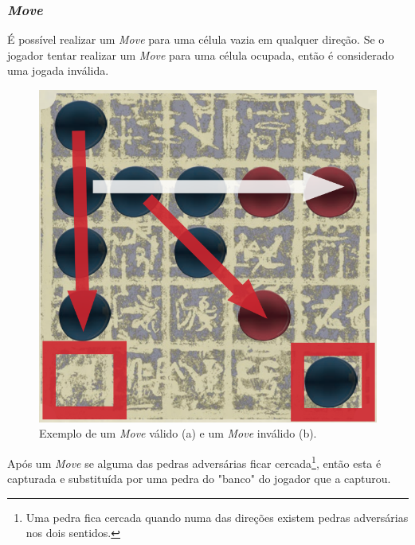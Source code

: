 \documentclass[a4paper]{article}
\begin{document}
\subsubsection{\textit{Move}}

É possível realizar um  \textit{Move} para uma célula vazia em qualquer direção. Se o jogador tentar realizar um \textit{Move} para uma célula ocupada, então é considerado uma jogada inválida.

\begin{figure}[!htb]
\centering
\includegraphics[scale=0.3]{push2.png} 
\caption{Exemplo de um \textit{Move} válido (a) e um \textit{Move} inválido (b).}
\end{figure}

Após um \textit{Move} se alguma das pedras adversárias ficar cercada\footnote{Uma pedra fica cercada quando numa das direções existem pedras adversárias nos dois sentidos.}, então esta é capturada e substituída por uma pedra do "banco" do jogador que a capturou.
\end{document}
